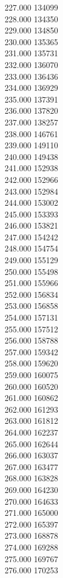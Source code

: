 { 227.000	134099 \\
 228.000	134350 \\
 229.000	134850 \\
 230.000	135365 \\
 231.000	135731 \\
 232.000	136070 \\
 233.000	136436 \\
 234.000	136929 \\
 235.000	137391 \\
 236.000	137820 \\
 237.000	138257 \\
 238.000	146761 \\
 239.000	149110 \\
 240.000	149438 \\
 241.000	152938 \\
 242.000	152966 \\
 243.000	152984 \\
 244.000	153002 \\
 245.000	153393 \\
 246.000	153821 \\
 247.000	154242 \\
 248.000	154754 \\
 249.000	155129 \\
 250.000	155498 \\
 251.000	155966 \\
 252.000	156834 \\
 253.000	156858 \\
 254.000	157131 \\
 255.000	157512 \\
 256.000	158788 \\
 257.000	159342 \\
 258.000	159620 \\
 259.000	160075 \\
 260.000	160520 \\
 261.000	160862 \\
 262.000	161293 \\
 263.000	161812 \\
 264.000	162237 \\
 265.000	162644 \\
 266.000	163037 \\
 267.000	163477 \\
 268.000	163828 \\
 269.000	164230 \\
 270.000	164633 \\
 271.000	165000 \\
 272.000	165397 \\
 273.000	168878 \\
 274.000	169288 \\
 275.000	169767 \\
 276.000	170253 \\
}
